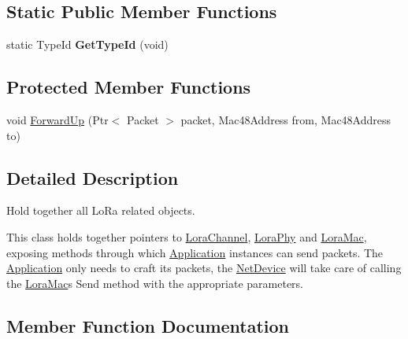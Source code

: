\subsection*{Static Public Member Functions}
\begin{DoxyCompactItemize}
\item 
\mbox{\label{classns3_1_1lorawan_1_1LoraNetDevice_aaa3016921735eb008b738748dad2d378}} 
static Type\+Id {\bfseries Get\+Type\+Id} (void)
\end{DoxyCompactItemize}
\subsection*{Protected Member Functions}
\begin{DoxyCompactItemize}
\item 
void \hyperlink{classns3_1_1lorawan_1_1LoraNetDevice_ab5a2f6dff4fa069c6ccee439f228909d}{Forward\+Up} (Ptr$<$ Packet $>$ packet, Mac48\+Address from, Mac48\+Address to)
\end{DoxyCompactItemize}


\subsection{Detailed Description}
Hold together all Lo\+Ra related objects.

This class holds together pointers to \hyperlink{classns3_1_1lorawan_1_1LoraChannel}{Lora\+Channel}, \hyperlink{classns3_1_1lorawan_1_1LoraPhy}{Lora\+Phy} and \hyperlink{classns3_1_1lorawan_1_1LoraMac}{Lora\+Mac}, exposing methods through which \hyperlink{classApplication}{Application} instances can send packets. The \hyperlink{classApplication}{Application} only needs to craft its packets, the \hyperlink{classNetDevice}{Net\+Device} will take care of calling the \hyperlink{classns3_1_1lorawan_1_1LoraMac}{Lora\+Mac}\textquotesingle{}s Send method with the appropriate parameters. 

\subsection{Member Function Documentation}
\mbox{\label{classns3_1_1lorawan_1_1LoraNetDevice_ab5a2f6dff4fa069c6ccee439f228909d}} 
